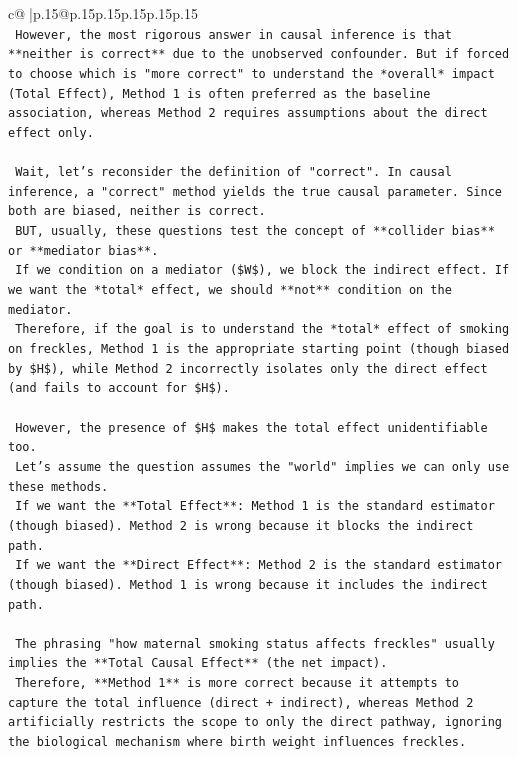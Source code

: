 \documentclass{article}
\begin{document}
{\begin{supertabular}{c@{$\;$}|p{.15\linewidth}@{}p{.15\linewidth}p{.15\linewidth}p{.15\linewidth}p{.15\linewidth}p{.15\linewidth}}
{{{\\ 
\texttt{    However, the most rigorous answer in causal inference is that **neither is correct** due to the unobserved confounder. But if forced to choose which is "more correct" to understand the *overall* impact (Total Effect), Method 1 is often preferred as the baseline association, whereas Method 2 requires assumptions about the direct effect only.} \\
\\ 
\texttt{    Wait, let's reconsider the definition of "correct". In causal inference, a "correct" method yields the true causal parameter. Since both are biased, neither is correct.} \\
\texttt{    BUT, usually, these questions test the concept of **collider bias** or **mediator bias**.} \\
\texttt{    If we condition on a mediator (\$W\$), we block the indirect effect. If we want the *total* effect, we should **not** condition on the mediator.} \\
\texttt{    Therefore, if the goal is to understand the *total* effect of smoking on freckles, Method 1 is the appropriate starting point (though biased by \$H\$), while Method 2 incorrectly isolates only the direct effect (and fails to account for \$H\$).} \\
\\ 
\texttt{    However, the presence of \$H\$ makes the total effect unidentifiable too.} \\
\texttt{    Let's assume the question assumes the "world" implies we can only use these methods.} \\
\texttt{    If we want the **Total Effect**: Method 1 is the standard estimator (though biased). Method 2 is wrong because it blocks the indirect path.} \\
\texttt{    If we want the **Direct Effect**: Method 2 is the standard estimator (though biased). Method 1 is wrong because it includes the indirect path.} \\
\\ 
\texttt{    The phrasing "how maternal smoking status affects freckles" usually implies the **Total Causal Effect** (the net impact).} \\
\texttt{    Therefore, **Method 1** is more correct because it attempts to capture the total influence (direct + indirect), whereas Method 2 artificially restricts the scope to only the direct pathway, ignoring the biological mechanism where birth weight influences freckles.} \\
}}}
\end{supertabular}}
\end{document}
